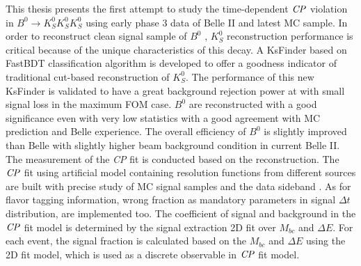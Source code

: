 This thesis presents the first attempt to study the time-dependent $\it{CP}$ violation in $B^0 \to K_S^0  K_S^0  K_S^0$ using early phase 3 data of Belle II and latest MC sample. In order to reconstruct clean signal sample of $B^0$ , $K_S^0$ reconstruction performance is critical because of the unique characteristics of this decay. A KsFinder based on FastBDT classification algorithm is developed to offer a goodness indicator of traditional cut-based reconstruction of $K_S^0$. The performance of this new KsFinder is validated to have a great background rejection power at  with small signal loss in the maximum FOM case. $B^0$ are reconstructed with a good significance even with very low statistics with a good agreement with MC prediction and Belle experience.
 The overall efficiency of $B^0$ is slightly improved than Belle with slightly higher beam background condition in current Belle II. The measurement  of the \textit{CP} fit is conducted based on the reconstruction. The $\it{CP}$ fit using artificial model containing resolution functions from different sources are built with precise study of MC signal samples and the data sideband . As for flavor tagging information, wrong fraction as mandatory parameters in signal $\Delta t$ distribution, are implemented too. The coefficient of signal and background in the $\it{CP}$ fit model is determined by the signal extraction 2D fit over $M_{bc}$ and $\Delta E$. For each event, the signal fraction is calculated based on the $M_{bc}$ and $\Delta E$ using the 2D fit model, which is used as a discrete observable in $\it{CP}$ fit model.
 
 
 
